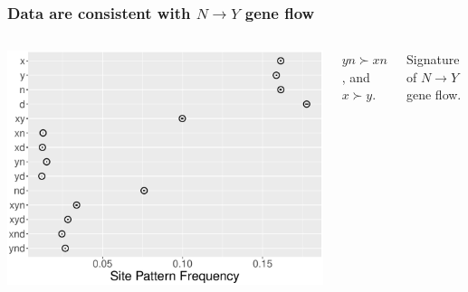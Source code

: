 \documentclass[pdftex,12pt]{beamer}
\begin{document}
\begin{frame}
  \frametitle{Data are consistent with $N \rightarrow Y$ gene flow}
  \begin{columns}
    \includegraphics[width=\linewidth]{xynd-frq.pdf}
    \raggedleft

    $yn \succ xn$, and $x \succ y$.

    \bigskip

    Signature of $N \rightarrow Y$ gene flow.
    
  \end{columns}
\end{frame}
\end{document}
